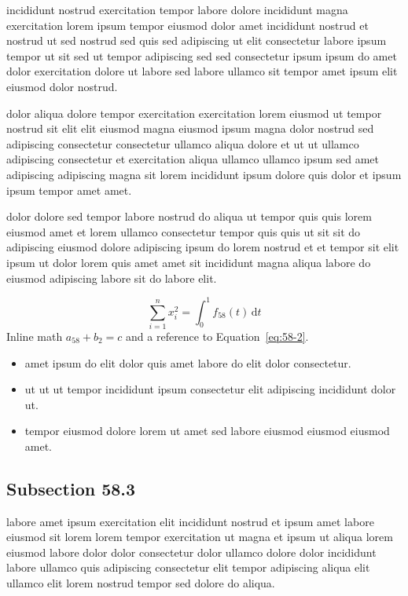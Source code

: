 \documentclass{article}
\begin{document}
incididunt nostrud exercitation tempor labore dolore incididunt magna exercitation lorem ipsum tempor eiusmod dolor amet incididunt nostrud et nostrud ut sed nostrud sed quis sed adipiscing ut elit consectetur labore ipsum tempor ut sit sed ut tempor adipiscing sed sed consectetur ipsum ipsum do amet dolor exercitation dolore ut labore sed labore ullamco sit tempor amet ipsum elit eiusmod dolor nostrud.

dolor aliqua dolore tempor exercitation exercitation lorem eiusmod ut tempor nostrud sit elit elit eiusmod magna eiusmod ipsum magna dolor nostrud sed adipiscing consectetur consectetur ullamco aliqua dolore et ut ut ullamco adipiscing consectetur et exercitation aliqua ullamco ullamco ipsum sed amet adipiscing adipiscing magna sit lorem incididunt ipsum dolore quis dolor et ipsum ipsum tempor amet amet.

dolor dolore sed tempor labore nostrud do aliqua ut tempor quis quis lorem eiusmod amet et lorem ullamco consectetur tempor quis quis ut sit sit do adipiscing eiusmod dolore adipiscing ipsum do lorem nostrud et et tempor sit elit ipsum ut dolor lorem quis amet amet sit incididunt magna aliqua labore do eiusmod adipiscing labore sit do labore elit.

\begin{equation}\label{eq:58-2}
  \sum_{i=1}^{n} x_i^{2} = \int_0^1 f_{58}(t)\,\mathrm{d}t
\end{equation}
Inline math $a_{58} + b_{2} = c$ and a reference to Equation~\eqref{eq:58-2}.

\begin{itemize}
  \item amet ipsum do elit dolor quis amet labore do elit dolor consectetur.
  \item ut ut ut tempor incididunt ipsum consectetur elit adipiscing incididunt dolor ut.
  \item tempor eiusmod dolore lorem ut amet sed labore eiusmod eiusmod eiusmod amet.
\end{itemize}

\subsection{Subsection 58.3}\label{sec:58-3}
labore amet ipsum exercitation elit incididunt nostrud et ipsum amet labore eiusmod sit lorem lorem tempor exercitation ut magna et ipsum ut aliqua lorem eiusmod labore dolor dolor consectetur dolor ullamco dolore dolor incididunt labore ullamco quis adipiscing consectetur elit tempor adipiscing aliqua elit ullamco elit lorem nostrud tempor sed dolore do aliqua.
\end{document}
